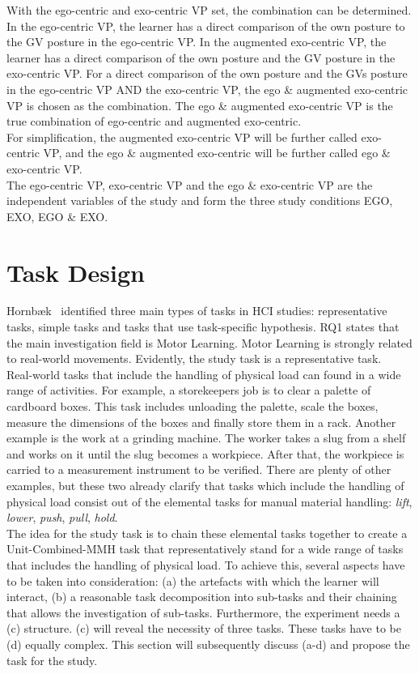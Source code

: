 With the ego-centric and exo-centric VP set, the combination can be determined. In the ego-centric VP, the learner has a direct comparison of the own posture to the GV posture in the ego-centric VP. In the augmented exo-centric VP, the learner has a direct comparison of the own posture and the GV posture in the exo-centric VP. For a direct comparison of the own posture and the GVs posture in the ego-centric VP AND the exo-centric VP, the ego \& augmented exo-centric VP is chosen as the combination. The ego \& augmented exo-centric VP is the true combination of ego-centric and augmented exo-centric.\\
For simplification, the augmented exo-centric VP will be further called exo-centric VP, and the ego \& augmented exo-centric will be further called ego \& exo-centric VP.\\
The ego-centric VP, exo-centric VP and the ego \& exo-centric VP are the independent variables of the study and form the three study conditions EGO, EXO, EGO \& EXO.

\section{Task Design}
\label{sec:taskDesign}
Hornb\ae{}k~\cite{hornbaek} identified three main types of tasks in HCI studies: representative tasks, simple tasks and tasks that use task-specific hypothesis. RQ1 states that the main investigation field is Motor Learning. Motor Learning is strongly related to real-world movements. Evidently, the study task is a representative task.\\
Real-world tasks that include the handling of physical load can found in a wide range of activities. For example, a storekeepers job is to clear a palette of cardboard boxes. This task includes unloading the palette, scale the boxes, measure the dimensions of the boxes and finally store them in a rack. Another example is the work at a grinding machine. The worker takes a slug from a shelf and works on it until the slug becomes a workpiece. After that, the workpiece is carried to a measurement instrument to be verified. There are plenty of other examples, but these two already clarify that tasks which include the handling of physical load consist out of the elemental tasks for manual material handling: \textit{lift}, \textit{lower}, \textit{push}, \textit{pull}, \textit{hold}.\\
The idea for the study task is to chain these elemental tasks together to create a Unit-Combined-MMH task that representatively stand for a wide range of tasks that includes the handling of physical load. To achieve this, several aspects have to be taken into consideration: (a) the artefacts with which the learner will interact, (b) a reasonable task decomposition into sub-tasks and their chaining that allows the investigation of sub-tasks. Furthermore, the experiment needs a (c) structure. (c) will reveal the necessity of three tasks. These tasks have to be (d) equally complex. This section will subsequently discuss (a-d) and propose the task for the study.

